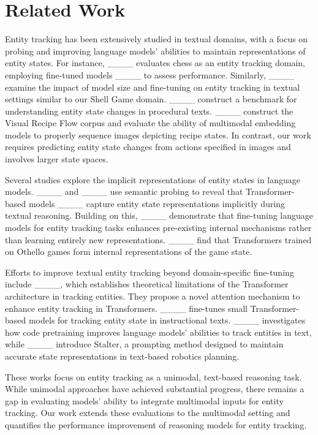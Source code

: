 \section{Related Work}
Entity tracking has been extensively studied in textual domains, with a focus on probing and improving language models' abilities to maintain representations of entity states. For instance, ____ evaluates chess as an entity tracking domain, employing fine-tuned models ____ to assess performance. Similarly, ____ examine the impact of model size and fine-tuning on entity tracking in textual settings similar to our Shell Game domain. ____ construct a benchmark for understanding entity state changes in procedural texts. ____ construct the Visual Recipe Flow corpus and evaluate the ability of multimodal embedding models to properly sequence images depicting recipe states. In contrast, our work requires predicting entity state changes from actions specified in images and involves larger state spaces.

Several studies explore the implicit representations of entity states in language models. ____ and ____ use semantic probing to reveal that Transformer-based models ____ capture entity state representations implicitly during textual reasoning. Building on this, ____ demonstrate that fine-tuning language models for entity tracking tasks enhances pre-existing internal mechanisms rather than learning entirely new representations. ____ find that Transformers trained on Othello games form internal representations of the game state.

Efforts to improve textual entity tracking beyond domain-specific fine-tuning include ____, which establishes theoretical limitations of the Transformer architecture in tracking entities. They propose a novel attention mechanism to enhance entity tracking in Transformers. ____ fine-tunes small Transformer-based models for tracking entity state in instructional texts. ____ investigates how code pretraining improves language models' abilities to track entities in text, while ____ introduce Stalter, a prompting method designed to maintain accurate state representations in text-based robotics planning.

These works focus on entity tracking as a unimodal, text-based reasoning task. While unimodal approaches have achieved substantial progress, there remains a gap in evaluating models' ability to integrate multimodal inputs for entity tracking. Our work extends these evaluations to the multimodal setting and quantifies the performance improvement of reasoning models for entity tracking.
